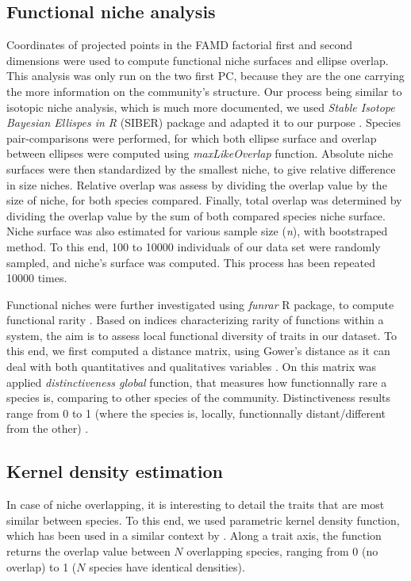  \subsection{Functional niche analysis}
 Coordinates of projected points in the FAMD factorial first and second dimensions were used to compute functional niche surfaces and ellipse overlap. This analysis was only run on the two first PC, because they are the one carrying the more information on the community's structure. Our process being similar to isotopic niche analysis, which is much more documented, we used \emph{Stable Isotope Bayesian Ellispes in R} (SIBER) package and adapted it to our purpose \citep{siber2011}. Species pair-comparisons were performed, for which both ellipse surface and overlap between ellipses were computed using \emph{maxLikeOverlap} function. Absolute niche surfaces were then standardized by the smallest niche, to give relative difference in size niches. Relative overlap was assess by dividing the overlap value by the size of niche, for both species compared. Finally, total overlap was determined by dividing the overlap value by the sum of both compared species niche surface. Niche surface was also estimated for various sample size (\textit{n}), with bootstraped method. To this end, 100 to 10000 individuals of our data set were randomly sampled, and niche's surface was computed. This process has been repeated 10000 times.

 Functional niches were further investigated using \emph{funrar} R package, to compute functional rarity \citep{matthiasgrenie2017}. Based on \citet{violle2017} indices characterizing rarity of functions within a system, the aim is to assess local functional diversity of traits in our dataset. To this end, we first computed a distance matrix, using Gower's distance as it can deal with both quantitatives and qualitatives variables \citep{brindamour2016,matthiasgrenie2017}. On this matrix was applied \emph{distinctiveness global} function, that measures how functionnally rare a species is, comparing to other species of the community. Distinctiveness results range from 0 to 1 (where the species is, locally, functionnally distant/different from the other) \citep{matthiasgrenie2017}.

 \subsection{Kernel density estimation}
 In case of niche overlapping, it is interesting to detail the traits that are most similar between species. To this end, we used \citep{mouillot2005} parametric kernel density function, which has been used in a similar context by \citet{aneeshkumar2017}. Along a trait axis, the function returns the overlap value between $N$ overlapping species, ranging from 0 (no overlap) to 1 ($N$ species have identical densities).